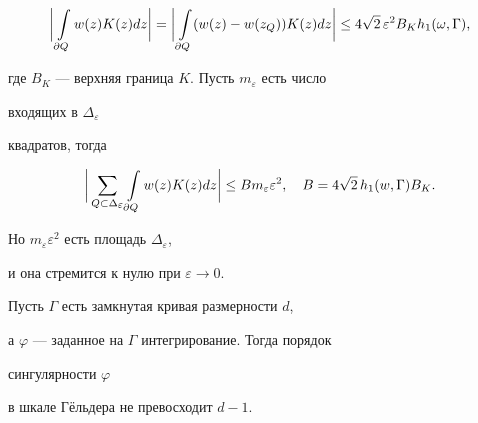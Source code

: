 \begin{pf}
$$ 


\bigg|\intl_{\partial Q}w(z)K(z)dz\bigg| 


=\bigg|\intl_{\partial Q}(w(z)-w(z_Q))K(z)dz\bigg| 


\le 4\sqrt{2}\,\varepsilon^2B_K h_1(\omega,\Gamma), 


$$ 


где $B_K$ --- верхняя граница $K$. Пусть $m_\varepsilon$ есть число 


входящих в $\Delta_\varepsilon$ 


квадратов, тогда 


$$ 


\bigg|\sum_{Q\subset\Delta_{\scriptstyle\varepsilon}}\intl_{\partial Q} 


w(z)K(z)dz\bigg|\le B m_\varepsilon\varepsilon^2,\quad 


B=4\sqrt{2}\,h_1(w,\Gamma)B_K. 


$$ 


Но $m_\varepsilon\varepsilon^2$ есть площадь $\Delta_\varepsilon$, 


и она стремится к нулю при $\varepsilon\to 0$. 


\end{pf} 


 


\begin{thm} Пусть $\Gamma$ есть замкнутая кривая размерности $d$, 


а $\varphi$ --- заданное на $\Gamma$ интегрирование. Тогда порядок 


сингулярности $\varphi$ 


в шкале Г\"ельдера не превосходит $d-1$. 


\end{thm} 


 


